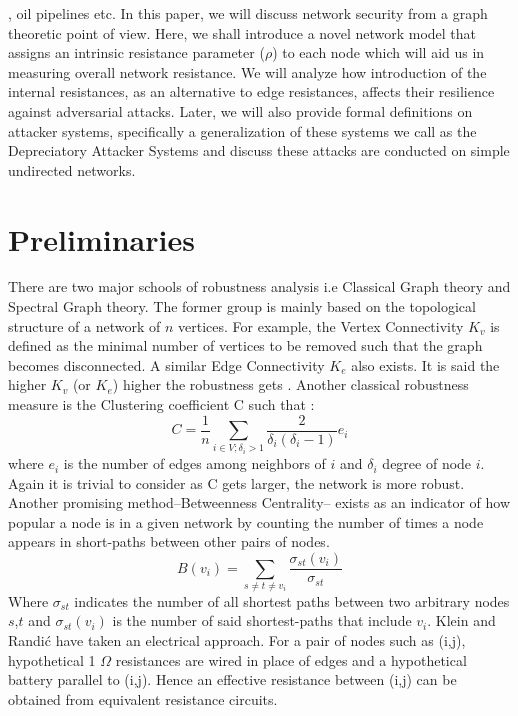 \documentclass{article}
\begin{document}
\cite{guze4805898continuous}, oil pipelines\cite{Pipeline} etc. In this paper, we will discuss network security from a graph theoretic point of view. Here, we shall introduce a novel network model that assigns an intrinsic resistance parameter ($\rho$) to each node which will aid us in measuring overall network resistance. We will analyze how introduction of the internal resistances, as an alternative to edge resistances, affects their resilience against adversarial attacks. Later, we will also provide formal definitions on attacker systems, specifically a generalization of these systems we call as the Depreciatory Attacker Systems and discuss these attacks are conducted on simple undirected networks.
	
	
	\section{Preliminaries}
	There are two major schools of robustness analysis i.e Classical Graph theory and Spectral Graph theory. The former group is mainly based on the topological structure of a network of $n$ vertices. For example, the Vertex Connectivity $K_v$ is defined as the minimal number of vertices to be removed such that the graph becomes disconnected. A similar Edge Connectivity $K_e$ also exists. It is said the higher $K_v$ (or $K_e$) higher the robustness gets \cite{ellens2013graph}. Another classical robustness measure is the Clustering coefficient C such that \cite{watts1998collective}:
	\begin{equation*}
		C = \frac{1}{n} \sum_{i\in V;\delta_i>1}\frac{2}{\delta_i(\delta_i -1)}e_i
	\end{equation*}
	where $e_i$ is the number of edges among neighbors of $i$ and $\delta_i$ degree of node $i$. Again it is trivial to consider as C gets larger, the network is more robust. Another promising method--Betweenness Centrality-- exists as an indicator of how popular a node is in a given network by counting the number of times a node appears in short-paths between other pairs of nodes.\cite{lee2021betweenness}\cite{chen2013node}
	\begin{equation*}
		B(v_i) = \sum_{s\neq t\neq v_i}\frac{\sigma_{st}(v_i)}{\sigma_{st}}
	\end{equation*}
	Where $\sigma_{st}$ indicates the number of all shortest paths between two arbitrary nodes $s$,$t$ and $\sigma_{st}(v_i)$ is the number of said shortest-paths that include $v_i$.
	Klein and Randi\'{c} \cite{klein1993m} have taken an electrical approach. For a pair of nodes such as (i,j), hypothetical 1 $\Omega$ resistances are wired in place of edges and a hypothetical battery parallel to (i,j). Hence an effective resistance between (i,j) can be obtained from equivalent resistance circuits.
\end{document}
